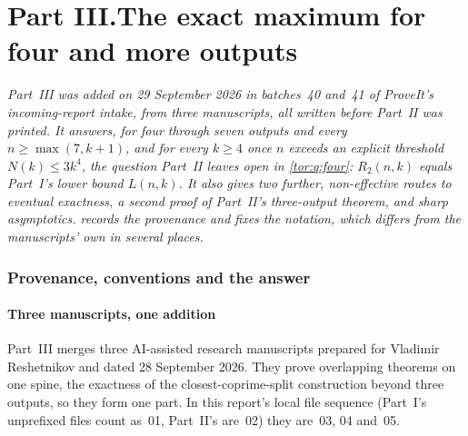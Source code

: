 \documentclass[11pt,a4paper]{article}
\numberwithin{equation}{section}
\theoremstyle{definition}
\theoremstyle{remark}
\begin{document}
\clearpage
\begingroup
\renewcommand{\UrlBreaks}{\do\.\do\@\do\\\do\/\do\!\do\_\do\|\do\;\do\>\do\]\do\)\do\,\do\?\do\'\do+\do\=\do\#\do\-}
\part*{Part III.\quad The exact maximum for four and more outputs}

\noindent\emph{Part~III was added on 29 September 2026 in batches~40 and~41
of ProveIt's incoming-report intake, from three manuscripts, all written
before Part~II was printed. It answers, for four through seven outputs and
every $n\ge\max(7,k+1)$, and for every $k\ge4$ once $n$ exceeds an explicit
threshold $N(k)\le3k^4$, the question Part~II leaves open in
\cref{tor:q:four}: $R_2(n,k)$ equals Part~I's lower bound $L(n,k)$. It also
gives two further, non-effective routes to eventual exactness, a second proof
of Part~II's three-output theorem, and sharp asymptotics.
 records the provenance and fixes the notation, which
differs from the manuscripts' own in several places.}

\section{Provenance, conventions and the answer}\label{evo:sec:intro}

\subsection{Three manuscripts, one addition}\label{evo:sec:source}

Part~III merges three AI-assisted research manuscripts prepared for Vladimir
Reshetnikov and dated 28 September 2026. They prove overlapping theorems on
one spine, the exactness of the closest-coprime-split construction beyond
three outputs, so they form one part. In this report's local file sequence
(Part~I's unprefixed files count as~01, Part~II's are~02) they are~03, 04
and~05.
\end{document}
